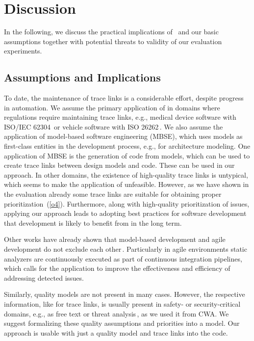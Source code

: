 \section{Discussion}\label{sec:disc}

In the following, we discuss the practical implications of \appr\ and our basic assumptions together with potential threats to validity of our evaluation experiments.

\subsection{Assumptions and Implications}
\label{sec:implication}
To date, the maintenance of trace links is a considerable effort, despite progress in automation.
We assume the primary application of \appr{} in domains where regulations require maintaining  trace links, e.g., medical device software with ISO/IEC 62304\,\cite{IEC62304} or vehicle software with ISO 26262\,\cite{ISO26262}.
We also assume the application of model-based software engineering (MBSE), which uses models as first-class entities in the development process, e.g., for architecture modeling.
One application of MBSE is the generation of code from models, which can be used to create trace links between design models and code.
These can be used in our approach.
In other domains, the existence of high-quality trace links is untypical, which seems to make the application of \appr{} unfeasible.
However, as we have shown in the evaluation already some trace links are suitable for obtaining proper prioritization~(\ref{o4}).
Furthermore, along with high-quality prioritization of issues, applying our approach leads to adopting best practices for software development that development is likely to benefit from in the long term.

Other works have already shown that model-based development and agile development do not exclude each other\,\cite{Gray2018}.
Particularly in agile environments static analyzers are continuously executed as part of continuous integration pipelines, which calls for the application \appr{} to improve the effectiveness and efficiency of addressing detected issues.

Similarly, quality models are not present in many cases.
However, the respective information, like for trace links, is usually present in safety- or security-critical domains, e.g., as free text or threat analysis\,\cite{TUMA2018275}, as we used it from CWA.
We suggest formalizing  these quality assumptions and priorities into a model.
Our approach is usable with just a quality model and trace links into the code.


